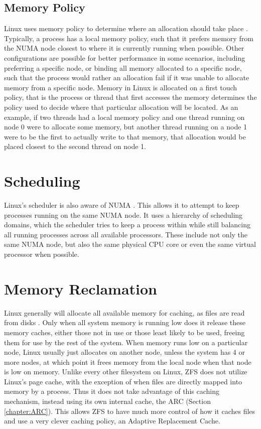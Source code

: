 \subsection{Memory Policy}
Linux uses memory policy to determine where an allocation should take place \cite[{Documentation/admin-guide/mm/numa\_memory\_policy.rst}]{linux}. 
Typically, a process has a local memory policy, such that it prefers memory from the NUMA node closest to where it is currently running when possible. 
Other configurations are possible for better performance in some scenarios, including preferring a specific node,
or binding all memory allocated to a specific node, such that the process would rather an allocation fail if it was unable to allocate memory 
from a specific node.
Memory in Linux is allocated on a first touch policy, that is the process or thread that first accesses the memory determines the policy used to decide
where that particular allocation will be located.
As an example, if two threads had a local memory policy and one thread running on node 0 were to allocate some memory,
but another thread running on a node 1 were to be the first to actually write to that memory,
that allocation would be placed closest to the second thread on node 1.

\section{Scheduling}
Linux's scheduler is also aware of NUMA \cite[{Documentation/scheduler/sched-domains.txt}]{linux}.
This allows it to attempt to keep processes running on the same NUMA node.
It uses a hierarchy of scheduling domains, which the scheduler tries to keep a process within while still balancing all running processes across
all available processors. 
These include not only the same NUMA node, but also the same physical CPU core or even the same virtual processor when possible.

\section{Memory Reclamation}
Linux generally will allocate all available memory for caching, as files are read from disks \cite{lameter_numa_2013}.
Only when all system memory is running low does it release these memory caches, either those not in use or those least likely to be used,
freeing them for use by the rest of the system.
When memory runs low on a particular node, Linux usually just allocates on another node, unless the system has 4 or more nodes,
at which point it frees memory from the local node when that node is low on memory.
Unlike every other filesystem on Linux, ZFS does not utilize Linux's page cache, with the exception of when files are directly mapped into memory
by a process.
Thus it does not take advantage of this caching mechanism, instead using its own internal cache, the ARC (Section \ref{chapter:ARC}).
This allows ZFS to have much more control of how it caches files and use a very clever caching policy, an Adaptive Replacement Cache.

